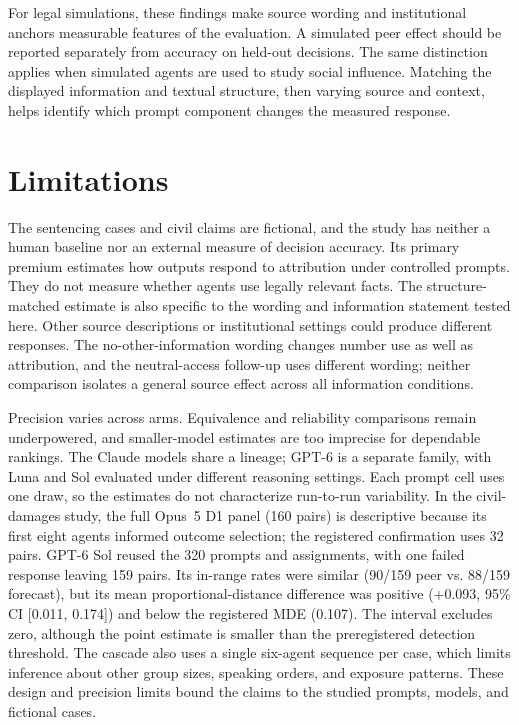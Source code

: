 \documentclass{article}
\begin{document}
For legal simulations, these findings make source wording and institutional anchors measurable
features of the evaluation. A simulated peer effect should be reported separately from accuracy on
held-out decisions. The same distinction applies when simulated
agents are used to study social influence. Matching the displayed information and textual structure,
then varying source and context, helps identify which prompt component changes the measured response.

\section{Limitations}

The sentencing cases and civil claims are fictional, and the study has neither a human baseline nor
an external measure of decision accuracy. Its primary premium estimates how outputs respond to
attribution under controlled prompts. They do not measure whether agents use legally relevant facts.
The structure-matched estimate is also
specific to the wording and information statement tested here. Other source descriptions or
institutional settings could produce different responses. The no-other-information wording changes
number use as well as attribution, and the neutral-access follow-up uses different wording; neither
comparison isolates a general source effect across all information conditions.

Precision varies across arms. Equivalence and reliability comparisons remain underpowered, and
smaller-model estimates are too imprecise for dependable rankings. The Claude models share a lineage;
GPT-6 is a separate family, with Luna and Sol evaluated under different reasoning settings. Each
prompt cell uses one draw, so the estimates do not characterize run-to-run variability. In the
civil-damages study, the full Opus~5 D1 panel (160 pairs) is descriptive because its first eight
agents informed outcome selection; the registered confirmation uses 32 pairs. GPT-6 Sol reused the
320 prompts and assignments, with one failed response leaving 159 pairs. Its in-range rates were
similar (90/159 peer vs. 88/159 forecast), but its mean proportional-distance difference was
positive (+0.093, 95\% CI [0.011, 0.174]) and below the registered MDE (0.107). The interval
excludes zero, although the point estimate is smaller than the preregistered detection threshold.
The cascade also uses a single six-agent sequence per case, which limits inference about other group
sizes, speaking orders, and exposure patterns. These design and precision limits bound the claims to
the studied prompts, models, and fictional cases.
\end{document}
